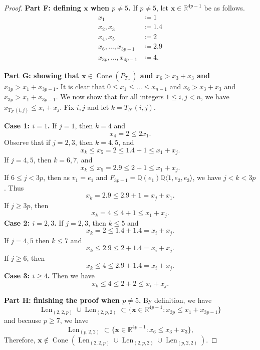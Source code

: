 \documentclass[10pt,a4paper]{amsart}
\DeclareMathOperator{\Cone}{Cone}
\DeclareMathOperator{\Len}{Len}
\newcommand{\QQ}{\mathbb{Q}}      %
\newcommand{\RR}{\mathbb{R}}      %
\newcommand{\cF}{\mathcal{F}}
\newcommand{\la}{\langle}
\newcommand{\ra}{\rangle}
\begin{document}
\begin{proof}
\noindent \textbf{Part F: defining $\mathbf{x}$ when $p \neq 5$.}
If $p \neq 5$, let $\mathbf{x} \in \RR^{4p-1}$ be as follows.
\begin{align*}
x_1 &\coloneqq 1 \\
x_2, x_3 &\coloneqq 1.4 \\
x_4, x_5 &\coloneqq 2 \\
x_6, \dots, x_{3p-1} &\coloneqq 2.9 \\
x_{3p}, \dots, x_{4p-1} &\coloneqq 4.
\end{align*}

\noindent \textbf{Part G: showing that $\mathbf{x} \in \Cone(P_{T_{\cF}})$ and $x_6 > x_3 + x_3$ and $x_{3p} > x_1 + x_{3p-1}$.}
It is clear that $0\leq x_1 \leq \dots \leq x_{n-1}$ and $x_6 > x_3 + x_3$ and $x_{3p} > x_1 + x_{3p-1}$. We now show that for all integers $1 \leq i,j < n$, we have $x_{T_{\cF}(i,j)} \leq x_i + x_j$. Fix $i,j$ and let $k = T_{\cF}(i,j)$.

\noindent \textbf{Case 1: $i = 1$.}
If $j = 1$, then $k = 4$ and
\[
	x_4 = 2 \leq 2x_1.
\]
Observe that if $j = 2,3$, then $k = 4,5$, and
\[
	x_k \leq x_5 = 2 \leq 1.4 + 1 \leq x_1 + x_j.
\]
If $j = 4,5$, then $k = 6,7$, and
\[
	x_k \leq x_5 = 2.9 \leq 2 + 1 \leq x_1 + x_j.
\]
If $6 \leq j < 3p$, then as $v_1 = e_1$ and $F_{3p-1} = \QQ( e_1 ) \QQ \la 1, e_2, e_3 \ra$, we have $j < k < 3p$. Thus
\[
	x_k = 2.9 \leq 2.9 + 1 = x_j + x_1.
\]
If $j \geq 3p$, then
\[
	x_k = 4 \leq 4 + 1 \leq x_1 + x_j.
\]
\textbf{Case 2: $i = 2,3$.} 
If $j = 2,3$, then $k \leq 5$ and
\[
	x_k = 2 \leq 1.4 + 1.4 = x_i + x_j.
\]
If $j = 4,5$ then $k \leq 7$ and
\[
	x_k \leq 2.9 \leq 2 + 1.4 = x_i + x_j.
\]
If $j \geq 6$, then
\[
	x_k \leq 4 \leq 2.9 + 1.4 = x_i + x_j.
\]
\textbf{Case 3: $i \geq 4$.}
Then we have
\[
	x_k \leq 4 \leq 2 + 2 \leq x_i + x_j.
\]

\noindent \textbf{Part H: finishing the  proof when $p \neq 5$.}
By definition, we have
\[
	\Len_{(2,2,p)} \cup \Len_{(2,p,2)} \subset \{\mathbf{x} \in \RR^{4p-1} : x_{3p} \leq x_1 + x_{3p-1} \}
\]
and because $p \geq 7$, we have
\[
	\Len_{(p,2,2)} \subset \{\mathbf{x} \in \RR^{4p-1} : x_6 \leq x_3 + x_3 \},
\]
Therefore, $\mathbf{x} \notin \Cone(\Len_{(2,2,p)} \cup \Len_{(2,p,2)} \cup \Len_{(p,2,2)})$.
\end{proof}
\end{document}

